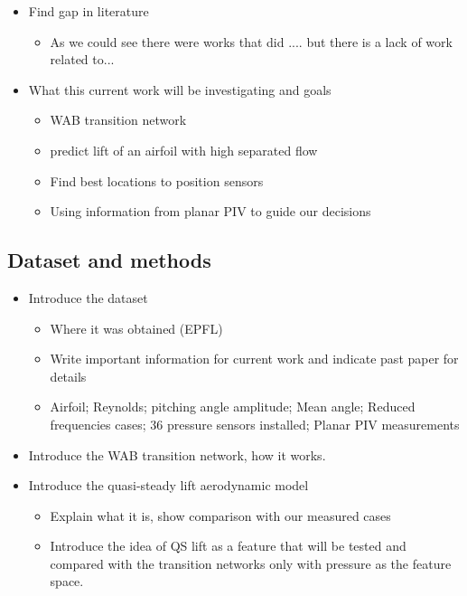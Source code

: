 \documentclass[%
 reprint,
 amsmath,amssymb,
 aps,
]{revtex4-2}
\begin{document}
\begin{itemize}
     \item Find gap in literature
    \begin{itemize}
    \item As we could see there were works that did .... but there is a lack of work related to...
\end{itemize}
    \item What this current work will be investigating and goals
    \begin{itemize}
    \item WAB transition network
    \item predict lift of an airfoil with high separated flow
    \item Find best locations to position sensors
    \item Using information from planar PIV to guide our decisions
    \end{itemize}    
\end{itemize}
    
    \vspace{1em}
\subsection{Dataset and methods}

\begin{itemize}
    \item Introduce the dataset
        \begin{itemize}
        \item Where it was obtained (EPFL)
        \item Write important information for current work and indicate past paper for details
        \item Airfoil; Reynolds; pitching angle amplitude; Mean angle; Reduced frequencies cases; 36 pressure sensors installed; Planar PIV measurements
        \end{itemize}

    \item Introduce the WAB transition network, how it works.

    \item Introduce the quasi-steady lift aerodynamic model
        \begin{itemize} 
        \item Explain what it is, show comparison with our measured cases
        \item Introduce the idea of QS lift as a feature that will be tested and compared with the transition networks only with pressure as the feature space.
        \end{itemize}
\end{itemize}
\end{document}
